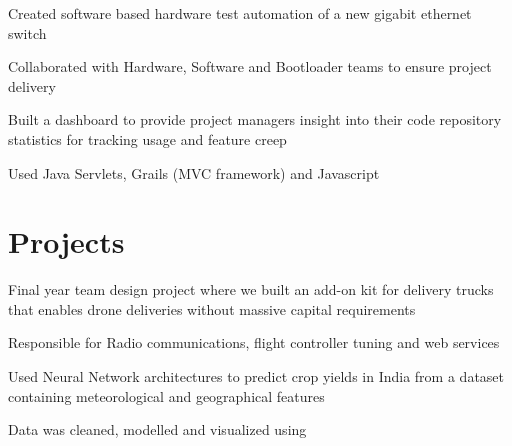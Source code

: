 \documentclass[]{deedy-resume-openfont}
\begin{document}
\begin{minipage}[t]{0.64\textwidth}
\begin{tightemize}
\item Created software based hardware test automation of a new gigabit ethernet switch
\item Collaborated with Hardware, Software and Bootloader teams to ensure
  project delivery 
\end{tightemize}
\sectionsep

\begin{tightemize}
\item Built a dashboard to provide project managers insight into their code
  repository statistics for tracking usage and feature creep 
\item Used Java Servlets, Grails (MVC framework) and Javascript 
\end{tightemize}
\sectionsep





\section{Projects}
\begin{tightemize}
\item Final year team design project where we built an add-on kit for delivery
  trucks that enables drone deliveries without massive capital requirements
\item Responsible for Radio communications, flight controller tuning and web
  services
\end{tightemize}
\sectionsep

\begin{tightemize}
\item Used Neural Network architectures to predict crop yields in India from a
  dataset containing meteorological and geographical features
\item Data was cleaned, modelled and visualized using 
\end{tightemize}
\sectionsep


\end{minipage}
\end{document}
